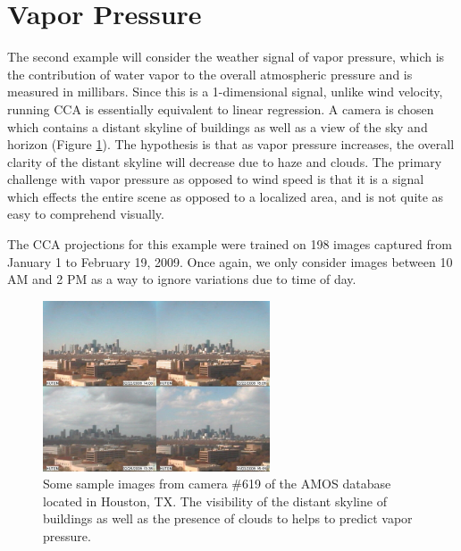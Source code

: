 \section{Vapor Pressure}
The second example will consider the weather signal of vapor pressure, which is the contribution of water vapor to the overall atmospheric pressure and is measured in millibars. Since this is a 1-dimensional signal, unlike wind velocity, running CCA is essentially equivalent to linear regression. A camera is chosen which contains a distant skyline of buildings as well as a view of the sky and horizon (Figure \ref{fig:vaporextremes}). The hypothesis is that as vapor pressure increases, the overall clarity of the distant skyline will decrease due to haze and clouds. The primary challenge with vapor pressure as opposed to wind speed is that it is a signal which effects the entire scene as opposed to a localized area, and is not quite as easy to comprehend visually.

The CCA projections for this example were trained on 198 images captured from January 1 to February 19, 2009. Once again, we only consider images between 10 AM and 2 PM as a way to ignore variations due to time of day.
\begin{figure}
	\centering
		\includegraphics[width=0.60\textwidth]{figures/vaporextremes.jpg}
	\caption{Some sample images from camera $\#$619 of the AMOS database located in Houston, TX. The visibility of the distant skyline of buildings as well as the presence of clouds to helps to predict vapor pressure.}
	\label{fig:vaporextremes}
\end{figure}

